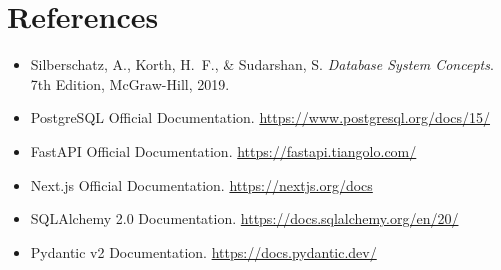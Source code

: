 \documentclass[twocolumn,12pt]{article}
\begin{document}
\section{References}

\begin{itemize}[leftmargin=*]
    \item Silberschatz, A., Korth, H.~F., \& Sudarshan, S. \textit{Database System Concepts}. 7th Edition, McGraw-Hill, 2019.
    \item PostgreSQL Official Documentation. \url{https://www.postgresql.org/docs/15/}
    \item FastAPI Official Documentation. \url{https://fastapi.tiangolo.com/}
    \item Next.js Official Documentation. \url{https://nextjs.org/docs}
    \item SQLAlchemy 2.0 Documentation. \url{https://docs.sqlalchemy.org/en/20/}
    \item Pydantic v2 Documentation. \url{https://docs.pydantic.dev/}
\end{itemize}
\end{document}
